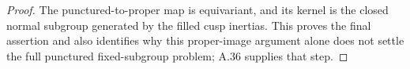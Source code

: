 \begin{proof}
The punctured-to-proper map is equivariant, and its kernel
is the closed normal subgroup generated by the filled
cusp inertias. This proves the final assertion and also
identifies why this proper-image argument alone does not settle
the full punctured fixed-subgroup problem; A.36 supplies that step.
\end{proof}
